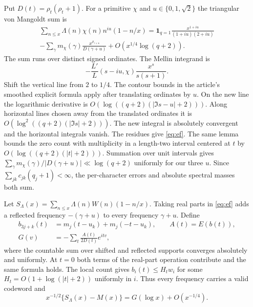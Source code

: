 \documentclass[11pt]{article}
\begin{document}
Put $D(t)=\rho_t(\rho_t+1)$. For a primitive $\chi$ and $u\in\{0,1,\sqrt2\}$ the triangular von Mangoldt sum is
\begin{multline}\label{eq:ef}
\sum_{n\le x}\Lambda(n)\chi(n)n^{iu}(1-n/x)
=\mathbf1_{q=1}\frac{x^{1+iu}}{(1+iu)(2+iu)}\\
 -\sum_{\gamma}m_\chi(\gamma)\frac{x^{\rho_{\gamma+u}}}{D(\gamma+u)}
 +O(x^{1/4}\log(q+2)).
\end{multline}
The sum runs over distinct signed ordinates. The Mellin integrand is
\[
 -\frac{L'}L(s-iu,\chi)\frac{x^s}{s(s+1)}.
\]
Shift the vertical line from $2$ to $1/4$. The contour bounds in the article's smoothed explicit formula \cite[lemma \texttt{rec:lem:triangle}]{repo} apply after translating ordinates by $u$. On the new line the logarithmic derivative is $O(\log((q+2)(|\Im s-u|+2)))$. Along horizontal lines chosen away from the translated ordinates it is $O(\log^2((q+2)(|\Im s|+2)))$. The new integral is absolutely convergent and the horizontal integrals vanish. The residues give \eqref{eq:ef}. The same lemma bounds the zero count with multiplicity in a length-two interval centered at $t$ by $O(\log((q+2)(|t|+2)))$. Summation over unit intervals gives $\sum_\gamma m_\chi(\gamma)/|D(\gamma+u)|\ll\log(q+2)$ uniformly for our three $u$. Since $\sum_{jk}c_{jk}(q_j+1)<\infty$, the per-character errors and absolute spectral masses both sum.

Let $S_\Lambda(x)=\sum_{n\le x}\Lambda(n)W(n)(1-n/x)$. Taking real parts in \eqref{eq:ef} adds a reflected frequency $-(\gamma+u)$ to every frequency $\gamma+u$. Define
\begin{align}
 b_{3j+k}(t)&=m_j(t-u_k)+m_j(-t-u_k),\qquad A(t)=E(b(t)),\label{eq:pairs}\\
 G(v)&=-\sum_t\frac{A(t)}{2D(t)}e^{itv},\label{eq:fourier}
\end{align}
where the countable sum over shifted and reflected supports converges absolutely and uniformly. At $t=0$ both terms of the real-part operation contribute and the same formula holds. The local count gives $b_i(t)\le H_t w_i$ for some $H_t=O(1+\log(|t|+2))$ uniformly in $i$. Thus every frequency carries a valid codeword and
\[
 x^{-1/2}\{S_\Lambda(x)-M(x)\}=G(\log x)+O(x^{-1/4}).
\]
\end{document}
